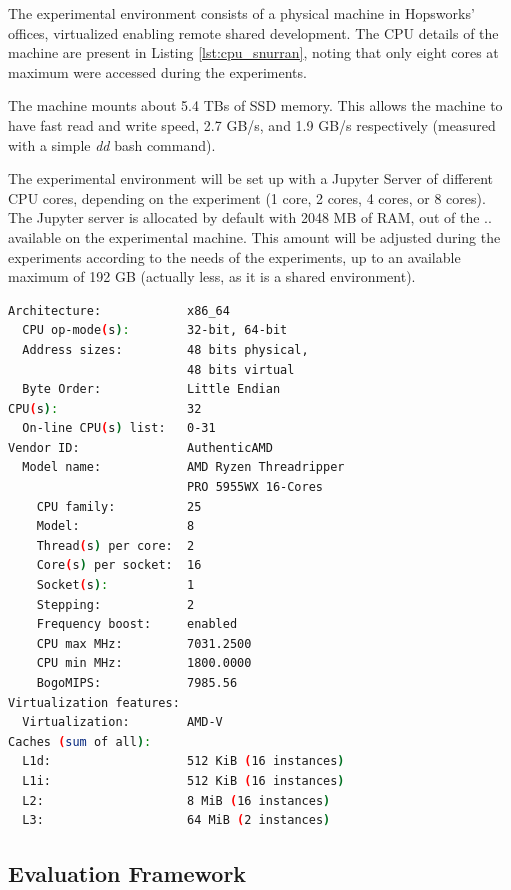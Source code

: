 The experimental environment consists of a physical machine in Hopsworks' offices, virtualized enabling remote shared development. The \gls{CPU} details of the machine are present in Listing \ref{lst:cpu_snurran}, noting that only eight cores at maximum were accessed during the experiments.

The machine mounts about 5.4 TBs of \gls{SSD} memory. This allows the machine to have fast read and write speed, 2.7 GB/s, and 1.9 GB/s respectively (measured with a simple \textit{dd} bash command). 

The experimental environment will be set up with a Jupyter Server of different CPU cores, depending on the experiment (1 core, 2 cores, 4 cores, or 8 cores). The Jupyter server is allocated by default with 2048 MB of \gls{RAM}, out of the .. available on the experimental machine. This amount will be adjusted during the experiments according to the needs of the experiments, up to an available maximum of 192 GB (actually less, as it is a shared environment).

\begin{lstlisting}[language=bash, caption={Output of a \textit{lscpu} bash command on the test environment.}, label={lst:cpu_snurran}, frame=tb]
Architecture:            x86_64
  CPU op-mode(s):        32-bit, 64-bit
  Address sizes:         48 bits physical, 
                         48 bits virtual
  Byte Order:            Little Endian
CPU(s):                  32
  On-line CPU(s) list:   0-31
Vendor ID:               AuthenticAMD
  Model name:            AMD Ryzen Threadripper 
                         PRO 5955WX 16-Cores
    CPU family:          25
    Model:               8
    Thread(s) per core:  2
    Core(s) per socket:  16
    Socket(s):           1
    Stepping:            2
    Frequency boost:     enabled
    CPU max MHz:         7031.2500
    CPU min MHz:         1800.0000
    BogoMIPS:            7985.56
Virtualization features: 
  Virtualization:        AMD-V
Caches (sum of all):     
  L1d:                   512 KiB (16 instances)
  L1i:                   512 KiB (16 instances)
  L2:                    8 MiB (16 instances)
  L3:                    64 MiB (2 instances)
\end{lstlisting}

\subsection{Evaluation Framework}
%

